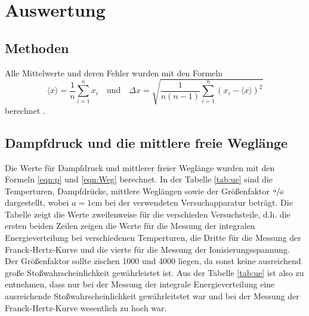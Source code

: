 \section{Auswertung}
\label{sec:Auswertung}


\subsection{Methoden}
Alle Mittelwerte und deren Fehler wurden mit den Formeln
\begin{equation}
  \langle x \rangle = \frac{1}{n} \sum_{i=1} ^{n} x_i \quad \text{und} \quad
  \Delta x = \sqrt{\frac{1}{n(n-1)} \sum_{i=1}^n (x_i - \langle x \rangle )^2}
  \label{eqn:MW}
\end{equation}
berechnet \cite{Tipler}.
\subsection{Dampfdruck und die mittlere freie Weglänge}
Die Werte für Dampfdruck und mittlerer freier Weglänge wurden mit den Formeln
\eqref{eqn:p} und \eqref{eqn:Weg} berechnet.
In der Tabelle \ref{tab:ue} sind die Temperturen, Dampfdrücke, mittlere Weglängen
sowie der Größenfaktor $ \sfrac{a}{\bar{w}}$ dargestellt, wobei $a = 1 \si{\centi \meter}$ bei
der verwendeten Versuchapparatur beträgt. Die Tabelle zeigt die Werte zweilenweise für
die verschieden Versuchsteile, d.h. die ersten beiden Zeilen zeigen die Werte für
die Messung der integralen Energieverteilung bei verschiedenen Temperturen, die Dritte
für die Messung der Franck-Hertz-Kurve und die vierte für die Messung der Ionisierungsspannung.
Der Größenfaktor sollte zischen 1000 und
4000 liegen, da sonst keine ausreichend große Stoßwahrscheinlichkeit gewährleistet ist.
Aus der Tabelle \ref{tab:ue} ist also zu entnehmen, dass nur bei der Messung
der integrale Energieverteilung eine ausreichende
Stoßwahrscheinlichkeit gewährleitstet war und bei der Messung der Franck-Hertz-Kurve
wesentlich zu hoch war.

